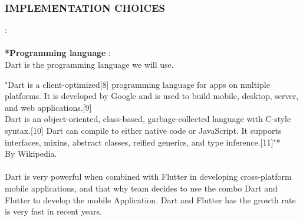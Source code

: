 \documentclass{article}
\begin{document}
\subsubsection{IMPLEMENTATION CHOICES} : \\ \\
\textbf{*Programming language} :\\
Dart is the programming language we will use.

"Dart is a client-optimized[8] programming language for apps on multiple platforms. It is developed by Google and is used to build mobile, desktop, server, and web applications.[9] \\
Dart is an object-oriented, class-based, garbage-collected language with C-style syntax.[10] Dart can compile to either native code or JavaScript. It supports interfaces, mixins, abstract classes, reified generics, and type inference.[11]"* \\
By Wikipedia.\\\\
Dart is very powerful when combined with Flutter in developing cross-platform mobile applications, and that why team decides to use the combo Dart and Flutter to develop the mobile Application.
Dart and Flutter has the growth rate is very fast in recent years.
\end{document}
